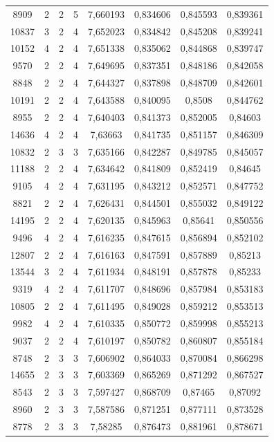 \begin{longtable}{|c|c|c|c|c|c|c|c|}
8909 & 2 & 2 & 5 & 7,660193 & 0,834606 & 0,845593 & 0,839361 \\
10837 & 3 & 2 & 4 & 7,652023 & 0,834842 & 0,845208 & 0,839241 \\
10152 & 4 & 2 & 4 & 7,651338 & 0,835062 & 0,844868 & 0,839747 \\
9570 & 2 & 2 & 4 & 7,649695 & 0,837351 & 0,848186 & 0,842058 \\
8848 & 2 & 2 & 4 & 7,644327 & 0,837898 & 0,848709 & 0,842601 \\
10191 & 2 & 2 & 4 & 7,643588 & 0,840095 & 0,8508 & 0,844762 \\
8955 & 2 & 2 & 4 & 7,640403 & 0,841373 & 0,852005 & 0,84603 \\
14636 & 4 & 2 & 4 & 7,63663 & 0,841735 & 0,851157 & 0,846309 \\
10832 & 2 & 3 & 3 & 7,635166 & 0,842287 & 0,849785 & 0,845057 \\
11188 & 2 & 2 & 4 & 7,634642 & 0,841809 & 0,852419 & 0,84645 \\
9105 & 4 & 2 & 4 & 7,631195 & 0,843212 & 0,852571 & 0,847752 \\
8821 & 2 & 2 & 4 & 7,626431 & 0,844501 & 0,855032 & 0,849122 \\
14195 & 2 & 2 & 4 & 7,620135 & 0,845963 & 0,85641 & 0,850556 \\
9496 & 4 & 2 & 4 & 7,616235 & 0,847615 & 0,856894 & 0,852102 \\
12807 & 2 & 2 & 4 & 7,616163 & 0,847591 & 0,857889 & 0,85213 \\
13544 & 3 & 2 & 4 & 7,611934 & 0,848191 & 0,857878 & 0,85233 \\
9319 & 4 & 2 & 4 & 7,611707 & 0,848696 & 0,857984 & 0,853183 \\
10805 & 2 & 2 & 4 & 7,611495 & 0,849028 & 0,859212 & 0,853513 \\
9982 & 4 & 2 & 4 & 7,610335 & 0,850772 & 0,859998 & 0,855213 \\
9037 & 2 & 2 & 4 & 7,610197 & 0,850782 & 0,860807 & 0,855184 \\
8748 & 2 & 3 & 3 & 7,606902 & 0,864033 & 0,870084 & 0,866298 \\
14655 & 2 & 3 & 3 & 7,603369 & 0,865269 & 0,871292 & 0,867527 \\
8543 & 2 & 3 & 3 & 7,597427 & 0,868709 & 0,87465 & 0,87092 \\
8960 & 2 & 3 & 3 & 7,587586 & 0,871251 & 0,877111 & 0,873528 \\
8778 & 2 & 3 & 3 & 7,58285 & 0,876473 & 0,881961 & 0,878671 \\

\end{longtable}
